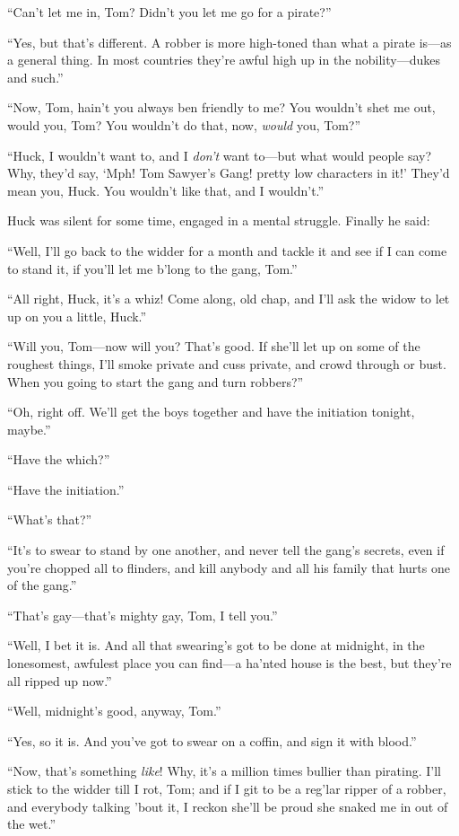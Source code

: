 \documentclass{book}
\begin{document}
“Can’t let me in, Tom? Didn’t you let me go for a pirate?”

“Yes, but that’s different. A robber is more high-toned than what a pirate is—as a general thing. In most countries they’re awful high up in the nobility—dukes and such.”

“Now, Tom, hain’t you always ben friendly to me? You wouldn’t shet me out, would you, Tom? You wouldn’t do that, now, \emph{would} you, Tom?”

“Huck, I wouldn’t want to, and I \emph{don’t} want to—but what would people say? Why, they’d say, ‘Mph! Tom Sawyer’s Gang! pretty low characters in it!’ They’d mean you, Huck. You wouldn’t like that, and I wouldn’t.”

Huck was silent for some time, engaged in a mental struggle. Finally he said:

“Well, I’ll go back to the widder for a month and tackle it and see if I can come to stand it, if you’ll let me b’long to the gang, Tom.”

“All right, Huck, it’s a whiz! Come along, old chap, and I’ll ask the widow to let up on you a little, Huck.”

“Will you, Tom—now will you? That’s good. If she’ll let up on some of the roughest things, I’ll smoke private and cuss private, and crowd through or bust. When you going to start the gang and turn robbers?”

“Oh, right off. We’ll get the boys together and have the initiation tonight, maybe.”

“Have the which?”

“Have the initiation.”

“What’s that?”

“It’s to swear to stand by one another, and never tell the gang’s secrets, even if you’re chopped all to flinders, and kill anybody and all his family that hurts one of the gang.”

“That’s gay—that’s mighty gay, Tom, I tell you.”

“Well, I bet it is. And all that swearing’s got to be done at midnight, in the lonesomest, awfulest place you can find—a ha’nted house is the best, but they’re all ripped up now.”

“Well, midnight’s good, anyway, Tom.”

“Yes, so it is. And you’ve got to swear on a coffin, and sign it with blood.”

“Now, that’s something \emph{like}! Why, it’s a million times bullier than pirating. I’ll stick to the widder till I rot, Tom; and if I git to be a reg’lar ripper of a robber, and everybody talking ’bout it, I reckon she’ll be proud she snaked me in out of the wet.”
\end{document}
